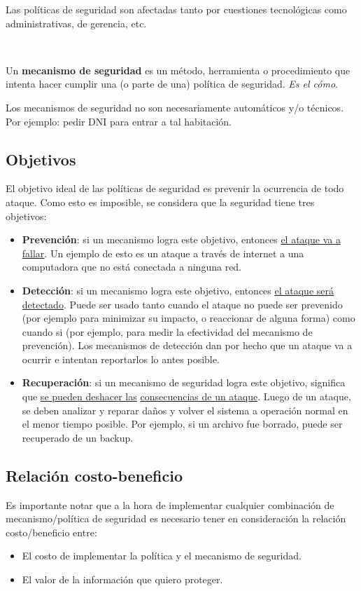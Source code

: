 \documentclass[]{article}
\begin{document}
Las políticas de seguridad son afectadas tanto por cuestiones tecnológicas como administrativas, de gerencia, etc.

~\newline

Un \textbf{mecanismo de seguridad} es un método, herramienta o procedimiento que intenta hacer cumplir una (o parte de una) política de seguridad. \emph{Es el cómo}.

Los mecanismos de seguridad no son necesariamente automáticos y/o técnicos. Por ejemplo: pedir DNI para entrar a tal habitación.


\subsection{Objetivos}
El objetivo ideal de las políticas de seguridad es prevenir la ocurrencia de todo ataque. Como esto es imposible, se considera que la seguridad tiene tres objetivos:

\begin{itemize}
	\item \textbf{Prevención}: si un mecanismo logra este objetivo, entonces \underline{el ataque va a fallar}. Un ejemplo de esto es un ataque a través de internet a una computadora que no está conectada a ninguna red.

	\item \textbf{Detección}: si un mecanismo logra este objetivo, entonces \underline{el ataque será detectado}. Puede ser usado tanto cuando el ataque no puede ser prevenido (por ejemplo para minimizar su impacto, o reaccionar de alguna forma) como cuando si (por ejemplo, para medir la efectividad del mecanismo de prevención). Los mecanismos de detección dan por hecho que un ataque va a ocurrir e intentan reportarlos lo antes posible.

	\item \textbf{Recuperación}: si un mecanismo de seguridad logra este objetivo, significa que \underline{se pueden deshacer las} \underline{consecuencias de un ataque}. Luego de un ataque, se deben analizar y reparar daños y volver el sistema a operación normal en el menor tiempo posible. Por ejemplo, si un archivo fue borrado, puede ser recuperado de un backup.
\end{itemize}


\subsection{Relación costo-beneficio}
Es importante notar que a la hora de implementar cualquier combinación de mecanismo/política de seguridad es necesario tener en consideración la relación costo/beneficio entre:
\begin{itemize}
	\item El costo de implementar la política y el mecanismo de seguridad.
	\item El valor de la información que quiero proteger.
\end{itemize}
\end{document}
